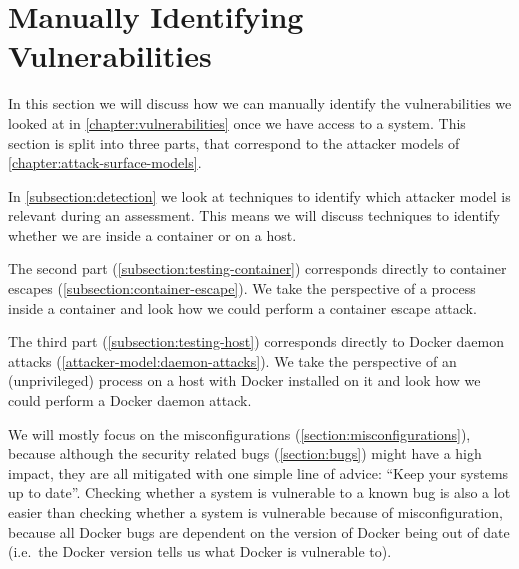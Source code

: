 \section{Manually Identifying Vulnerabilities}\label{section:identify-vulnerabilities}
In this section we will discuss how we can manually identify the vulnerabilities we looked at in \autoref{chapter:vulnerabilities} once we have access to a system. This section is split into three parts, that correspond to the attacker models of \autoref{chapter:attack-surface-models}.

In \autoref{subsection:detection} we look at techniques to identify which attacker model is relevant during an assessment. This means we will discuss techniques to identify whether we are inside a container or on a host.

The second part (\autoref{subsection:testing-container}) corresponds directly to container escapes (\autoref{subsection:container-escape}). We take the perspective of a process inside a container and look how we could perform a container escape attack.

The third part (\autoref{subsection:testing-host}) corresponds directly to Docker daemon attacks (\autoref{attacker-model:daemon-attacks}). We take the perspective of an (unprivileged) process on a host with Docker installed on it and look how we could perform a Docker daemon attack.

\medskip

We will mostly focus on the misconfigurations (\autoref{section:misconfigurations}), because although the security related bugs (\autoref{section:bugs}) might have a high impact, they are all mitigated with one simple line of advice: ``Keep your systems up to date''. Checking whether a system is vulnerable to a known bug is also a lot easier than checking whether a system is vulnerable because of misconfiguration, because all Docker bugs are dependent on the version of Docker being out of date (i.e.\ the Docker version tells us what Docker is vulnerable to).




